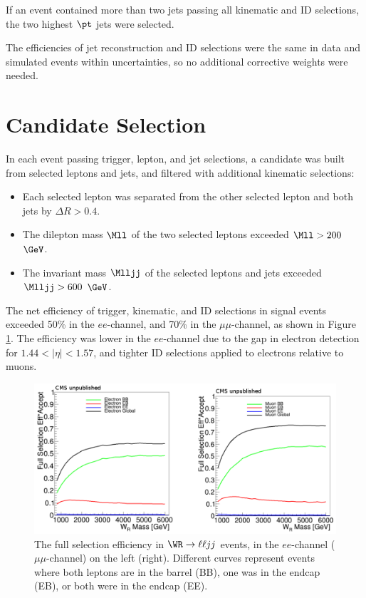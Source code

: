 If an event contained more than two jets passing all kinematic and ID selections, the two highest $\pt$ jets were selected.

The efficiencies of jet reconstruction and ID selections were the same in data and simulated events within uncertainties, so 
no additional corrective weights were needed.


\section{\WR Candidate Selection}
\label{sec:wrCandSelection}
In each event passing trigger, lepton, and jet selections, a \WR candidate was built from selected leptons and jets, and 
filtered with additional kinematic selections:

\begin{itemize}
	\item Each selected lepton was separated from the other selected lepton and both jets by $\Delta R > 0.4$.
	\item The dilepton mass $\Mll$ of the two selected leptons exceeded $\Mll > 200$ $\GeV$.
	\item The invariant mass $\Mlljj$ of the selected leptons and jets exceeded $\Mlljj > 600$ $\GeV$.
\end{itemize}

The net efficiency of trigger, kinematic, and ID selections in \WR signal events exceeded 50\% in the $ee$-channel, and 
70\% in the $\mu\mu$-channel, as shown in Figure \ref{fig:wrRecoSelectionEff}.  The efficiency was lower in the $ee$-channel due 
to the gap in electron detection for $1.44 < |\eta| < 1.57$, and tighter ID selections applied to electrons relative 
to muons.

\begin{figure}[h]
	\centering
	\includegraphics[width=1.0\textwidth]{figures/wrRecoSelectionEfficiency.png}
	\caption{The full selection efficiency in $\WR \rightarrow \ell\ell jj$ events, in the $ee$-channel ($\mu\mu$-channel) 
		on the left (right).  Different curves represent events where both leptons are in the barrel (BB), one was in the 
	endcap (EB), or both were in the endcap (EE).}
	\label{fig:wrRecoSelectionEff}
\end{figure}

